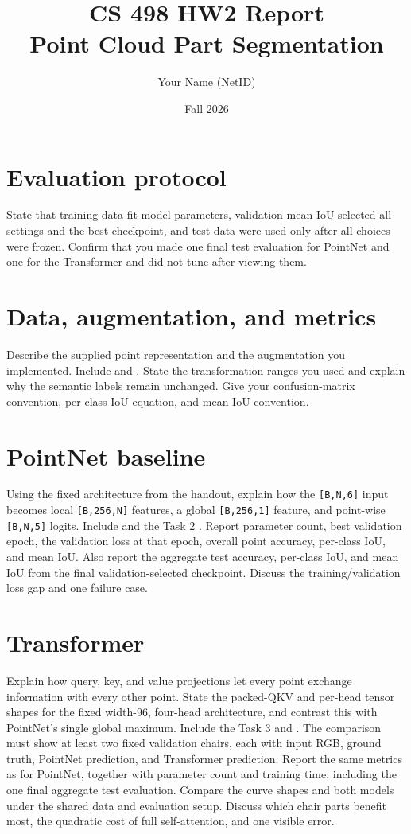 \documentclass[11pt]{article}
\title{CS 498 HW2 Report\\Point Cloud Part Segmentation}
\author{Your Name (NetID)}
\date{Fall 2026}
\begin{document}
\maketitle

\section{Evaluation protocol}
State that training data fit model parameters, validation mean IoU selected
all settings and the best checkpoint, and test data were used only after all
choices were frozen. Confirm that you made one final test evaluation for
PointNet and one for the Transformer and did not tune after viewing them.

\section{Data, augmentation, and metrics}
Describe the supplied point representation and the augmentation you
implemented. Include  and .
State the transformation ranges you used and explain why the semantic labels
remain unchanged. Give your confusion-matrix convention, per-class IoU
equation, and mean IoU convention.

\section{PointNet baseline}
Using the fixed architecture from the handout, explain how the
\texttt{[B,N,6]} input becomes local \texttt{[B,256,N]} features, a global
\texttt{[B,256,1]} feature, and point-wise \texttt{[B,N,5]} logits. Include
 and the Task 2
. Report parameter count, best validation epoch, the
validation loss at that epoch, overall point accuracy, per-class IoU, and mean
IoU. Also report the aggregate test accuracy, per-class IoU, and mean IoU from
the final validation-selected checkpoint. Discuss
the training/validation loss gap and one failure case.

\section{Transformer}
Explain how query, key, and value projections let every point exchange
information with every other point. State the packed-QKV and per-head tensor
shapes for the fixed width-96, four-head architecture, and contrast this with
PointNet's single global maximum. Include the Task 3  and
. The comparison must show at least two fixed
validation chairs, each with input RGB, ground truth, PointNet prediction, and
Transformer prediction.
Report the same metrics as for PointNet, together with parameter count and
training time, including the one final aggregate test evaluation. Compare the
curve shapes and both models under the shared data
and evaluation setup. Discuss which chair parts benefit most, the quadratic
cost of full self-attention, and one visible error.
\end{document}
